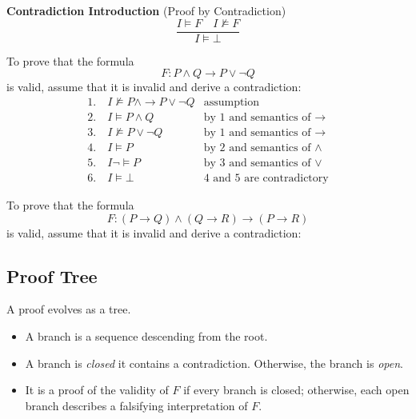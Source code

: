 \begin{center}
\textbf{Contradiction Introduction} (Proof by Contradiction) \[
\frac{I\models F\quad I\not\models F}{I\models\bot}
\]
\end{center}
\begin{example}
	To prove that the formula \[
	F:P\land Q\to P\lor\lnot Q
	\] is valid, assume that it is invalid and derive a contradiction:
	\[
	\begin{array}{ll}
		1.\quad I\not\models P\land \to P\lor\lnot Q & \text{assumption} \\
		2.\quad I\models P\land Q & \text{by 1 and semantics of $\to$} \\
		3.\quad I\not\models P\lor \lnot Q & \text{by 1 and semantics of $\to$} \\
		4.\quad I\models P & \text{by 2 and semantics of $\land$} \\
		5.\quad I\lnot\models P & \text{by 3 and semantics of $\lor$} \\
		6.\quad I\models\bot & \text{4 and 5 are contradictory}
	\end{array}
	\]
\end{example}

\begin{example}
	To prove that the formula \[
	F:(P\to Q)\land(Q\to R)\to(P\to R)
	\] is valid, assume that it is invalid and derive a contradiction:
\end{example}

\subsection{Proof Tree}

A proof evolves as a tree.
\begin{itemize}
	\item A branch is a sequence descending from the root.
	\item A branch is \textit{closed} it contains a contradiction. Otherwise, the branch is \textit{open}.
	\item It is a proof of the validity of $F$ if every branch is closed; otherwise, each open branch describes a falsifying interpretation of $F$.
\end{itemize}

